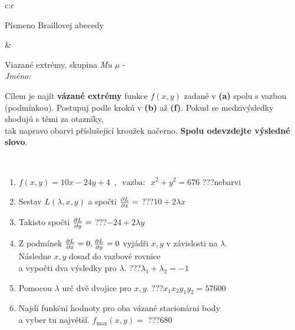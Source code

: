 \documentclass[10pt]{report}
\begin{document}
\begin{tabular}{c:c}
\begin{minipage}[c][104.5mm][t]{0.5\linewidth}
\begin{center}
\begin{minipage}{0.20\linewidth}
\begin{center}
{\small Písmeno Braillovej abecedy}
\end{center}
\end{minipage}
\end{center}
\end{minipage}
&
\begin{minipage}[c][104.5mm][t]{0.5\linewidth}
\begin{center}
\vspace{7mm}
{\huge Viazané extrémy, skupina \textit{Mu $\mu$} -}\\[5mm]
\textit{Jméno:}\phantom{xxxxxxxxxxxxxxxxxxxxxxxxxxxxxxxxxxxxxxxxxxxxxxxxxxxxxxxxxxxxxxxxx}\\[5mm]
\begin{minipage}{0.95\linewidth}
\begin{center}
Cílem je najít \textbf{vázané extrémy} funkce $f(x,y)$ zadané v \textbf{(a)} spolu s vazbou (podmínkou). Postupuj podle krokú v \textbf{(b)} až \textbf{(f)}. Pokud se medzivýsledky shodujú s těmi za otazníky,\\tak napravo obarvi příslušející kroužek načerno. \textbf{Spolu odevzdejte výsledné slovo}.
\end{center}
\end{minipage}
\\[1mm]
\begin{minipage}{0.79\linewidth}
\begin{center}
\begin{varwidth}{\linewidth}
\begin{enumerate}
\normalsize
\item $f(x,y)=10x-24y+4 \enspace , \enspace \mathrm{vazba:} \enspace x^2+y^2=676$\quad \dotfill\; ???\;\dotfill \quad nebarvi
\item Sestav $L(\lambda,x,y)$ a spočti $\pdv{L}{x}=$\quad \dotfill\; ???\;\dotfill \quad $10+2\lambda x$
\item Takisto spočti $\pdv{L}{y}=$\quad \dotfill\; ???\;\dotfill \quad $-24+2\lambda y$
\item Z podmínek $\pdv{L}{x}=0 , \pdv{L}{y}=0$ vyjádři $x,y$ v závislosti na $\lambda$.\\ \phantom{xxxxxx}Následne $x,y$ dosaď do vazbové rovnice\\ \phantom{xxxxxx}a vypočti dva výsledky pro $\lambda$.\quad \dotfill\; ???\;\dotfill \quad $\lambda_1+\lambda_2=-1$
\item Pomocou $\lambda$ urč dvě dvojice pro $x,y$.\quad \dotfill\; ???\;\dotfill \quad $x_1 x_2 y_1 y_2=57600$
\item Najdi funkční hodnoty pro oba vázané stacionární body\\ \phantom{xxxxxx}a vyber tu najvětší. $f_{\text{max}}(x,y)=$\quad \dotfill\; ???\;\dotfill \quad $680$

\end{enumerate}
\end{varwidth}
\end{center}
\end{minipage}
\end{center}
\end{minipage}
\end{tabular}
\end{document}
